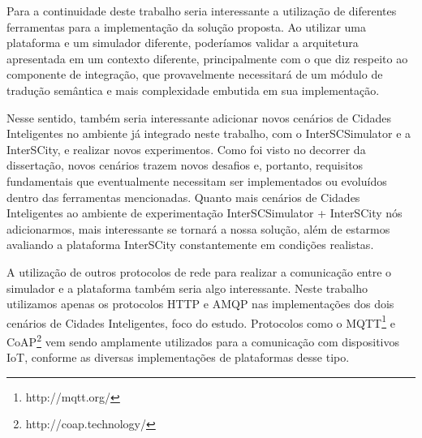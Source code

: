 Para a continuidade deste trabalho seria interessante a utilização de diferentes ferramentas para a implementação da solução proposta.
Ao utilizar uma plataforma e um simulador diferente, poderíamos validar a arquitetura apresentada em um contexto diferente, principalmente com o que diz respeito ao componente de integração, que provavelmente
necessitará de um módulo de tradução semântica e mais complexidade embutida em sua implementação.

Nesse sentido, também seria interessante adicionar novos cenários de Cidades Inteligentes no ambiente já integrado neste trabalho, com o InterSCSimulator e a InterSCity, e realizar novos experimentos.
Como foi visto no decorrer da dissertação, novos cenários trazem novos desafios e, portanto, requisitos fundamentais que eventualmente necessitam ser implementados ou evoluídos dentro das ferramentas 
mencionadas.
Quanto mais cenários de Cidades Inteligentes ao ambiente de experimentação InterSCSimulator + InterSCity nós adicionarmos, mais interessante se tornará a nossa solução, além de estarmos avaliando a
plataforma InterSCity constantemente em condições realistas.

A utilização de outros protocolos de rede para realizar a comunicação entre o simulador e a plataforma também seria algo interessante.
Neste trabalho utilizamos apenas os protocolos HTTP e AMQP nas implementações dos dois cenários de Cidades Inteligentes, foco do estudo.
Protocolos como o MQTT\footnote{http://mqtt.org/} e CoAP\footnote{http://coap.technology/} vem sendo amplamente utilizados para a comunicação com dispositivos IoT, conforme as diversas implementações de
plataformas desse tipo.

